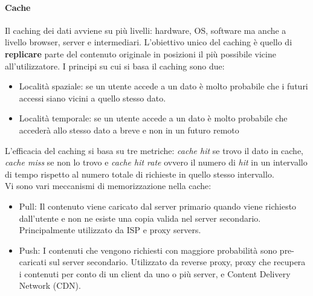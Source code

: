 \documentclass{article}
\begin{document}
		\paragraph{Cache}
		Il caching dei dati avviene su più livelli: hardware, OS, software ma anche a livello browser, server e intermediari. L'obiettivo unico del caching è quello di \textbf{replicare} parte del contenuto originale in posizioni il più possibile vicine all'utilizzatore.
		I principi su cui si basa il caching sono due:
		\begin{itemize}
			\item Località spaziale: se un utente accede a un dato è molto probabile che i futuri accessi siano vicini a quello stesso dato.
			\item Località temporale: se un utente accede a un dato è molto probabile che accederà allo stesso dato a breve e non in un futuro remoto
		\end{itemize}
		L'efficacia del caching si basa su tre metriche: \textit{cache hit} se trovo il dato in cache, \textit{cache miss} se non lo trovo e \textit{cache hit rate} ovvero il numero di \textit{hit} in un intervallo di tempo rispetto al numero totale di richieste in quello stesso intervallo.\\
		Vi sono vari meccanismi di memorizzazione nella cache:
		\begin{itemize}
		    \item Pull: Il contenuto viene caricato dal server primario quando viene richiesto dall'utente e non ne esiste una copia valida nel server secondario. Principalmente utilizzato da ISP e proxy servers.
		    \item Push: I contenuti che vengono richiesti con maggiore probabilità sono pre-caricati sul server secondario. Utilizzato da reverse proxy, proxy che recupera i contenuti per conto di un client da uno o più server, e Content Delivery Network (CDN).
		\end{itemize}
		
\end{document}
